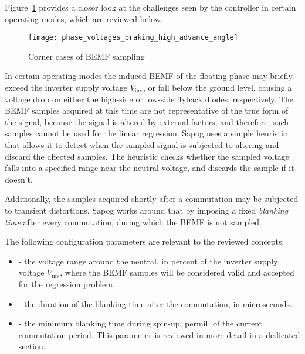 \documentclass{zubaxdoc}
\begin{document}
	Figure~\ref{phase_voltage_sampling_corner_cases} provides a closer look at the challenges
	seen by the controller in certain operating modes, which are reviewed below.
	
	\begin{figure}[hbtp]
		\centering
		\texttt{[image: phase\_voltages\_braking\_high\_advance\_angle]}
		\caption{Corner cases of BEMF sampling
			\label{phase_voltage_sampling_corner_cases}}
	\end{figure}
	
	In certain operating modes the induced BEMF of the floating phase may briefly exceed the
	inverter supply voltage $V_\text{inv}$, or fall below the ground level,
	causing a voltage drop on either the high-side or low-side flyback diodes, respectively.
	The BEMF samples acquired at this time are not representative of the true form of the signal,
	because the signal is altered by external factors;
	and therefore, such samples cannot be used for the linear regression.
	Sapog uses a simple heuristic that allows it to detect when the sampled signal is subjected to
	altering and discard the affected samples.
	The heuristic checks whether the sampled voltage falls into a specified range near the neutral voltage,
	and discards the sample if it doesn't.
	
	Additionally, the samples acquired shortly after a commutation may be subjected to transient distortions.
	Sapog works around that by imposing a fixed \emph{blanking time} after every commutation, during which
	the BEMF is not sampled.
	
	The following configuration parameters are relevant to the reviewed concepts:
	
	\begin{itemize}
		\item {} - the voltage range around the neutral,
		in percent of the inverter supply voltage $V_\text{inv}$, where the BEMF samples
		will be considered valid and accepted for the regression problem.
		\item {} - the duration of the blanking time after the commutation, in microseconds.
		\item {} - the minimum blanking time during spin-up,
		permill of the current commutation period.
		This parameter is reviewed in more detail in a dedicated section.
	\end{itemize}
	
\end{document}

